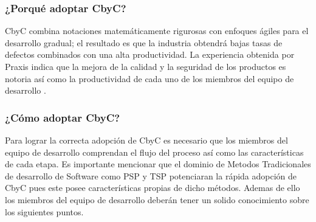 \documentclass[runningheads,a4paper]{llncs}
\begin{document}
\subsubsection{¿Porqué adoptar \gls{CbyC}?}
CbyC combina notaciones matemáticamente rigurosas con enfoques ágiles para el desarrollo gradual; el resultado es que la industria obtendrá bajas tasas de defectos combinados con una alta productividad.
La experiencia obtenida por \gls{Praxis} indica que la mejora de la calidad y la seguridad de los productos es notoria así como la productividad de cada uno de los miembros del equipo de desarrollo \cite{CbyCIntroduction}.

\subsubsection{¿Cómo adoptar \gls{CbyC}?}
Para lograr la correcta adopción de \gls{CbyC} es necesario que los miembros del equipo de desarrollo comprendan el flujo del proceso así como las características de cada etapa. Es importante mencionar que el dominio de \gls{Metodos Tradicionales} de desarrollo de \gls{Software} como \gls{PSP} y \gls{TSP} potenciaran la rápida adopción de \gls{CbyC} pues este posee características propias de dicho métodos. Ademas de ello los miembros del equipo de desarrollo deberán tener un solido conocimiento sobre los siguientes puntos. 
\end{document}
